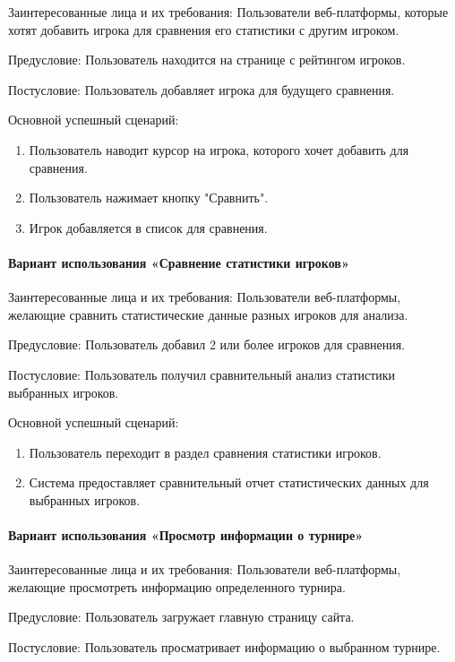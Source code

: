 Заинтересованные лица и их требования: Пользователи веб-платформы, которые хотят добавить игрока для сравнения его статистики с другим игроком.

Предусловие: Пользователь находится на странице с рейтингом игроков.

Постусловие: Пользователь добавляет игрока для будущего сравнения.

Основной успешный сценарий:
\begin{enumerate}
	\item Пользователь наводит курсор на игрока, которого хочет добавить для сравнения.
	\item Пользователь нажимает кнопку "Сравнить".
	\item Игрок добавляется в список для сравнения.
\end{enumerate}

\paragraph{Вариант использования «Сравнение статистики игроков»}

Заинтересованные лица и их требования: Пользователи веб-платформы, желающие сравнить статистические данные разных игроков для анализа.

Предусловие: Пользователь добавил 2 или более игроков для сравнения.

Постусловие: Пользователь получил сравнительный анализ статистики выбранных игроков.

Основной успешный сценарий:
\begin{enumerate}
	\item Пользователь переходит в раздел сравнения статистики игроков.
	\item Система предоставляет сравнительный отчет статистических данных для выбранных игроков.
\end{enumerate}

\paragraph{Вариант использования «Просмотр информации о турнире»}

Заинтересованные лица и их требования: Пользователи веб-платформы, желающие просмотреть информацию определенного турнира.

Предусловие: Пользователь загружает главную страницу сайта.

Постусловие: Пользователь просматривает информацию о выбранном турнире.

